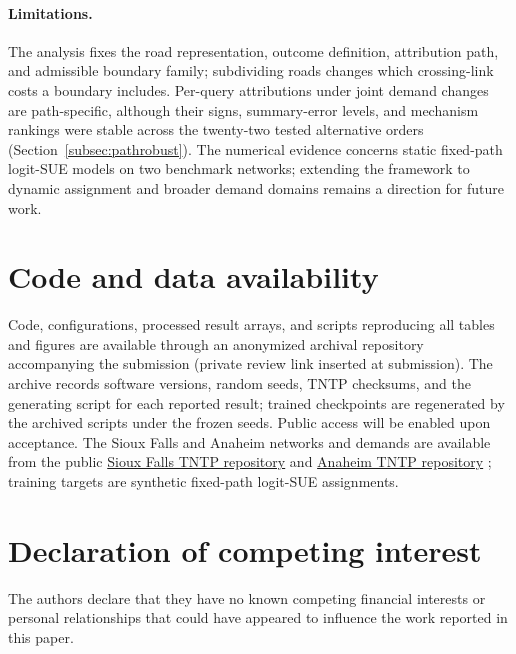 \documentclass[a4paper,fleqn]{cas-sc}
\begin{document}
\paragraph{Limitations.}
The analysis fixes the road representation, outcome definition,
attribution path, and admissible boundary family; subdividing roads
changes which crossing-link costs a boundary includes. Per-query
attributions under joint demand changes are path-specific, although
their signs, summary-error levels, and mechanism rankings were stable
across the twenty-two tested alternative orders
(Section~\ref{subsec:pathrobust}). The numerical evidence concerns
static fixed-path logit-SUE models on two benchmark networks; extending
the framework to dynamic assignment and broader demand domains remains
a direction for future work.

\section*{Code and data availability}
Code, configurations, processed result arrays, and scripts reproducing
all tables and figures are available through an anonymized archival
repository accompanying the submission (private review link inserted
at submission). The archive records software versions, random seeds,
TNTP checksums, and the generating script for each reported result;
trained checkpoints are regenerated by the archived scripts under the
frozen seeds. Public access will be enabled upon acceptance.
The Sioux Falls and Anaheim networks and demands are available from the public
\href{https://github.com/bstabler/TransportationNetworks/tree/master/SiouxFalls}{Sioux Falls TNTP repository}
and \href{https://github.com/bstabler/TransportationNetworks/tree/master/Anaheim}{Anaheim TNTP repository}
\citep{tnfrc2024transportation}; training targets are synthetic fixed-path
logit-SUE assignments.
\section*{Declaration of competing interest}
The authors declare that they have no known competing financial interests
or personal relationships that could have appeared to influence the work
reported in this paper.
\FloatBarrier

\setlength{\bibsep}{0.8pt plus 0.2pt}

\appendix
{}



\end{document}
